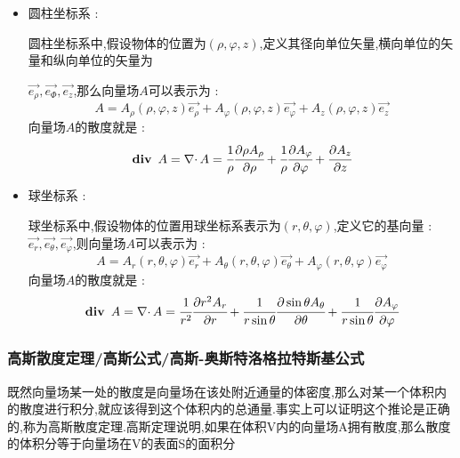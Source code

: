\documentclass[UTF8,12pt]{ctexbook}
\newcommand{\partialDerivativeFrac}[2]{\cfrac{\partial #1}{\partial #2}}
\DeclareMathOperator{\divergenceText}{\mathbf{div}\ }
\DeclareMathOperator{\divergenceSymbol}{\nabla\cdot}
\begin{document}
{{{{{\begin{itemize}
{              其中$\vec{i},\vec{j},\vec{k}$分别是$x,y,z$轴上的单位向量,场的分量$A_x,A_y,A_z$具有一阶连续偏导数,那么向量场$A$的散度就是 :
              $$
                \divergenceText A = \divergenceSymbol A = \partialDerivativeFrac{A_x}{x} + \partialDerivativeFrac{A_y}{y} + \partialDerivativeFrac{A_z}{z}
              $$
              }
        \item {
              圆柱坐标系 :

              圆柱坐标系中,假设物体的位置为$(\rho,\varphi,z)$,定义其径向单位矢量,横向单位的矢量和纵向单位的矢量为

              $\vec{e_{\rho}},\vec{e_{\varPhi}},\vec{e_z}$,那么向量场$A$可以表示为 :
              $$
                A = A_{\rho}(\rho,\varphi,z)\vec{e_{\rho}} + A_{\varphi}(\rho,\varphi,z)\vec{e_{\varphi}} + A_{z}(\rho,\varphi,z)\vec{e_{z}}
              $$
              向量场$A$的散度就是 :
              $$
                \divergenceText A = \divergenceSymbol A = \cfrac{1}{\rho}\partialDerivativeFrac{\rho A_\rho}{\rho} + \cfrac{1}{\rho}\partialDerivativeFrac{A_\varphi}{\varphi} + \partialDerivativeFrac{A_z}{z}
              $$
              }
        \item {
              球坐标系 :

              球坐标系中,假设物体的位置用球坐标系表示为$(r,\theta,\varphi)$,定义它的基向量 : $\vec{e_r},\vec{e_\theta},\vec{e_\varphi}$,则向量场$A$可以表示为 :
              $$
                A = A_r(r,\theta,\varphi)\vec{e_r} + A_\theta(r,\theta,\varphi)\vec{e_\theta} + A_\varphi(r,\theta,\varphi)\vec{e_\varphi}
              $$
              向量场$A$的散度就是 :
              $$
                \divergenceText A = \divergenceSymbol A = \cfrac{1}{r^2}\partialDerivativeFrac{r^2A_r}{r} + \cfrac{1}{r\sin\theta}\partialDerivativeFrac{\sin\theta A_\theta}{\theta} + \cfrac{1}{r\sin\theta}\partialDerivativeFrac{A_\varphi}{\varphi}
              $$
              }
      \end{itemize}
    }%

    \subsubsection{高斯散度定理/高斯公式/高斯-奥斯特洛格拉特斯基公式}{
      既然向量场某一处的散度是向量场在该处附近通量的体密度,那么对某一个体积内的散度进行积分,就应该得到这个体积内的总通量.事实上可以证明这个推论是正确的,称为高斯散度定理.高斯定理说明,如果在体积V内的向量场A拥有散度,那么散度的体积分等于向量场在V的表面S的面积分

}}}}}
\end{document}
